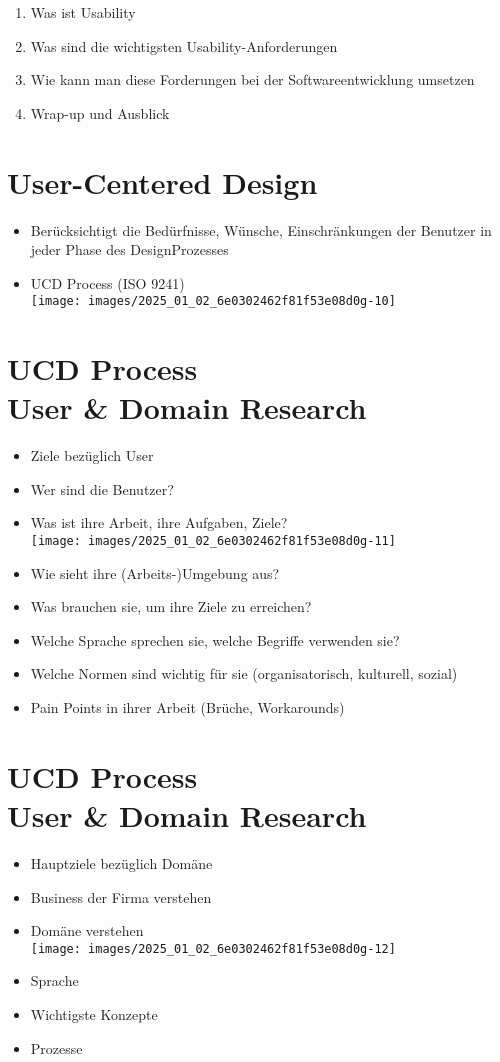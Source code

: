\documentclass[10pt]{article}
\begin{document}
\begin{enumerate}
  \item Was ist Usability
  \item Was sind die wichtigsten Usability-Anforderungen
  \item Wie kann man diese Forderungen bei der Softwareentwicklung umsetzen
  \item Wrap-up und Ausblick
\end{enumerate}

\section*{User-Centered Design}
\begin{itemize}
  \item Berücksichtigt die Bedürfnisse, Wünsche, Einschränkungen der Benutzer in jeder Phase des DesignProzesses
  \item UCD Process (ISO 9241)\\
\texttt{[image: images/2025\_01\_02\_6e0302462f81f53e08d0g-10]}
\end{itemize}

\section*{UCD Process \\
 User \& Domain Research}
\begin{itemize}
  \item Ziele bezüglich User
  \item Wer sind die Benutzer?
  \item Was ist ihre Arbeit, ihre Aufgaben, Ziele?\\
\texttt{[image: images/2025\_01\_02\_6e0302462f81f53e08d0g-11]}
  \item Wie sieht ihre (Arbeits-)Umgebung aus?
  \item Was brauchen sie, um ihre Ziele zu erreichen?
  \item Welche Sprache sprechen sie, welche Begriffe verwenden sie?
  \item Welche Normen sind wichtig für sie (organisatorisch, kulturell, sozial)
  \item Pain Points in ihrer Arbeit (Brüche, Workarounds)
\end{itemize}

\section*{UCD Process \\
 User \& Domain Research}
\begin{itemize}
  \item Hauptziele bezüglich Domäne
  \item Business der Firma verstehen
  \item Domäne verstehen\\
\texttt{[image: images/2025\_01\_02\_6e0302462f81f53e08d0g-12]}
  \item Sprache
  \item Wichtigste Konzepte
  \item Prozesse
\end{itemize}
\end{document}
